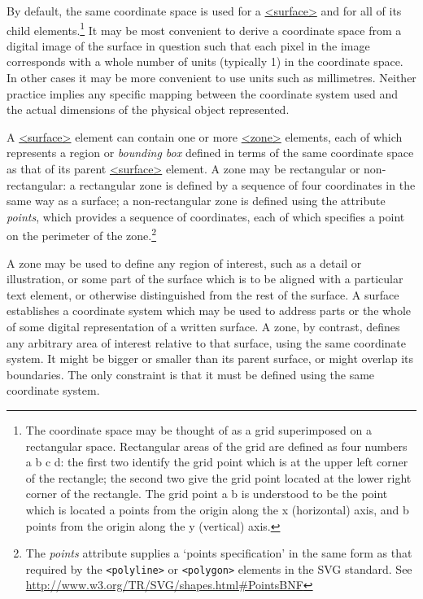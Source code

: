 \par
By default, the same coordinate space is used for a \hyperref[TEI.surface]{<surface>} and for all of its child elements.\footnote{The coordinate space may be thought of as a grid superimposed on a rectangular space. Rectangular areas of the grid are defined as four numbers a b c d: the first two identify the grid point which is at the upper left corner of the rectangle; the second two give the grid point located at the lower right corner of the rectangle. The grid point a b is understood to be the point which is located a points from the origin along the x (horizontal) axis, and b points from the origin along the y (vertical) axis.} It may be most convenient to derive a coordinate space from a digital image of the surface in question such that each pixel in the image corresponds with a whole number of units (typically 1) in the coordinate space. In other cases it may be more convenient to use units such as millimetres. Neither practice implies any specific mapping between the coordinate system used and the actual dimensions of the physical object represented.\par
A \hyperref[TEI.surface]{<surface>} element can contain one or more \hyperref[TEI.zone]{<zone>} elements, each of which represents a region or \textit{bounding box} defined in terms of the same coordinate space as that of its parent \hyperref[TEI.surface]{<surface>} element. A zone may be rectangular or non-rectangular: a rectangular zone is defined by a sequence of four coordinates in the same way as a surface; a non-rectangular zone is defined using the attribute {\itshape points}, which provides a sequence of coordinates, each of which specifies a point on the perimeter of the zone.\footnote{The {\itshape points} attribute supplies a ‘points specification’ in the same form as that required by the \texttt{<polyline>} or \texttt{<polygon>} elements in the SVG standard. See \url{http://www.w3.org/TR/SVG/shapes.html\#PointsBNF}}\par
A zone may be used to define any region of interest, such as a detail or illustration, or some part of the surface which is to be aligned with a particular text element, or otherwise distinguished from the rest of the surface. A surface establishes a coordinate system which may be used to address parts or the whole of some digital representation of a written surface. A zone, by contrast, defines any arbitrary area of interest relative to that surface, using the same coordinate system. It might be bigger or smaller than its parent surface, or might overlap its boundaries. The only constraint is that it must be defined using the same coordinate system. \par
